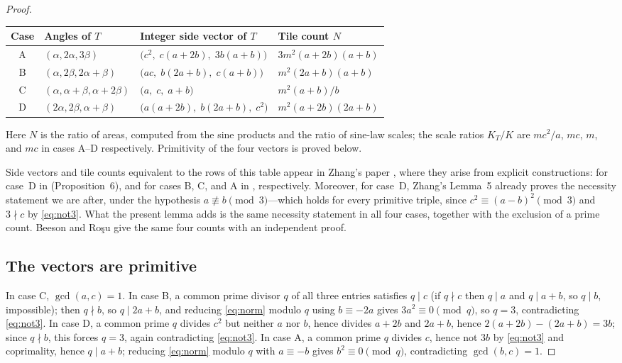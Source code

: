 \documentclass[11pt]{amsart}
\theoremstyle{remark}
\begin{document}
\begin{proof}
\begin{center}
\begin{tabular}{@{}clll@{}}
\toprule
Case & Angles of $T$ & Integer side vector of $T$ & Tile count $N$ \\
\midrule
A & $(\alpha,2\alpha,3\beta)$ & $\bigl(c^2,\;c(a+2b),\;3b(a+b)\bigr)$ & $3m^2(a+2b)(a+b)$ \\
B & $(\alpha,2\beta,2\alpha+\beta)$ & $\bigl(ac,\;b(2a+b),\;c(a+b)\bigr)$ & $m^2(2a+b)(a+b)$ \\
C & $(\alpha,\alpha+\beta,\alpha+2\beta)$ & $\bigl(a,\;c,\;a+b\bigr)$ & $m^2(a+b)/b$ \\
D & $(2\alpha,2\beta,\alpha+\beta)$ & $\bigl(a(a+2b),\;b(2a+b),\;c^2\bigr)$ & $m^2(a+2b)(2a+b)$ \\
\bottomrule
\end{tabular}
\end{center}

\smallskip
Here $N$ is the ratio of areas, computed from the sine products and the ratio of sine-law scales; the scale ratios $K_T/K$ are $mc^2/a$, $mc$, $m$, and $mc$ in cases A--D respectively. Primitivity of the four vectors is proved below.

Side vectors and tile counts equivalent to the rows of this table appear in Zhang's paper \cite{Zhang25}, where they arise from explicit constructions: for case~D in \cite[Section~4]{Zhang25} (Proposition~6), and for cases B, C, and A in \cite[Propositions~10, 9, and~11]{Zhang25}, respectively. Moreover, for case~D, Zhang's Lemma~5 already proves the necessity statement we are after, under the hypothesis $a\not\equiv b\pmod 3$---which holds for every primitive triple, since $c^2\equiv(a-b)^2\pmod 3$ and $3\nmid c$ by \eqref{eq:not3}. What the present lemma adds is the same necessity statement in all four cases, together with the exclusion of a prime count. Beeson and Ro\c{s}u \cite[Theorems~19--22]{BR} give the same four counts with an independent proof.

\subsection*{The vectors are primitive}
In case C, $\gcd(a,c)=1$. In case B, a common prime divisor $q$ of all three entries satisfies $q\mid c$ (if $q\nmid c$ then $q\mid a$ and $q\mid a+b$, so $q\mid b$, impossible); then $q\nmid b$, so $q\mid 2a+b$, and reducing \eqref{eq:norm} modulo $q$ using $b\equiv-2a$ gives $3a^2\equiv 0\pmod q$, so $q=3$, contradicting \eqref{eq:not3}. In case D, a common prime $q$ divides $c^2$ but neither $a$ nor $b$, hence divides $a+2b$ and $2a+b$, hence $2(a+2b)-(2a+b)=3b$; since $q\nmid b$, this forces $q=3$, again contradicting \eqref{eq:not3}. In case A, a common prime $q$ divides $c$, hence not $3b$ by \eqref{eq:not3} and coprimality, hence $q \mid a+b$; reducing \eqref{eq:norm} modulo $q$ with $a\equiv-b$ gives $b^2\equiv 0\pmod q$, contradicting $\gcd(b,c)=1$.


\end{proof}
\end{document}
